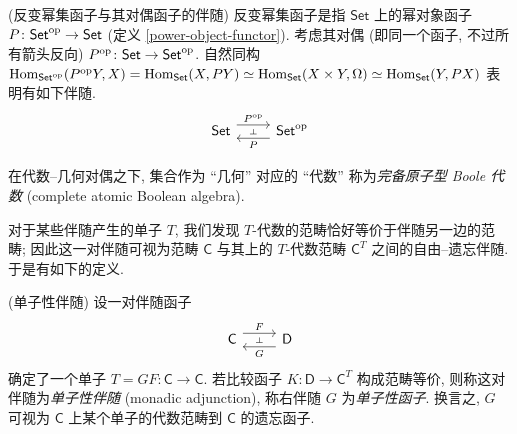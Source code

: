 \begin{example}
	{(反变幂集函子与其对偶函子的伴随)}
	反变幂集函子是指 $\mathsf {Set}$ 上的幂对象函子 $P\colon \mathsf {Set}^{\text{op}} \to \mathsf {Set}$ (定义 \ref{power-object-functor}). 考虑其对偶 (即同一个函子, 不过所有箭头反向) $P^{\text{op}}\colon \mathsf {Set}\to\mathsf {Set}^{\text{op}}$. 自然同构 $\operatorname{Hom}_{\mathsf {Set}^{\text{op}}}(P^{\text{op}} Y,X) = \operatorname{Hom}_{\mathsf {Set}}(X,PY)\simeq \operatorname{Hom}_{\mathsf {Set}}(X\times Y,\Omega) \simeq \operatorname{Hom}_{\mathsf {Set}}(Y,PX)$ 表明有如下伴随.
	\[\begin{tikzcd}[ampersand replacement=\&]
		{\mathsf {Set}} \& {\mathsf {Set}^\op}
		\arrow[""{name=0, anchor=center, inner sep=0}, "{P^\op}", shift left=2, from=1-1, to=1-2]
		\arrow[""{name=1, anchor=center, inner sep=0}, "P", shift left=2, from=1-2, to=1-1]
		\arrow["\dashv"{anchor=center, rotate=-90}, draw=none, from=0, to=1]
	\end{tikzcd}\]
	
	在代数--几何对偶之下, 集合作为 ``几何'' 对应的 ``代数'' 称为\emph{完备原子型 Boole 代数} (complete atomic Boolean algebra).
	\todo{}
\end{example}

对于某些伴随产生的单子 $T$, 我们发现 $T$-代数的范畴恰好等价于伴随另一边的范畴; 因此这一对伴随可视为范畴 $\mathsf C$ 与其上的 $T$-代数范畴 $\mathsf C^T$ 之间的自由--遗忘伴随. 于是有如下的定义.

\begin{definition}
    {(单子性伴随)}
    设一对伴随函子
    $$
    \begin{tikzcd}[ampersand replacement=\&]
    	{\mathsf C} \& {\mathsf D}
    	\arrow[""{name=0, anchor=center, inner sep=0}, "G", shift left=2, from=1-2, to=1-1]
    	\arrow[""{name=1, anchor=center, inner sep=0}, "F", shift left=2, from=1-1, to=1-2]
    	\arrow["\dashv"{anchor=center, rotate=-90}, draw=none, from=1, to=0]
    \end{tikzcd}
    $$
    确定了一个单子 $T = GF \colon \mathsf C \to \mathsf C$.
    若比较函子 $K\colon \mathsf D\to\mathsf C^T$ 构成范畴等价, 则称这对伴随为\emph{单子性伴随} (monadic adjunction), 称右伴随 $G$ 为\emph{单子性函子}. 换言之, $G$ 可视为 $\mathsf C$ 上某个单子的代数范畴到 $\mathsf C$ 的遗忘函子.
\end{definition}

